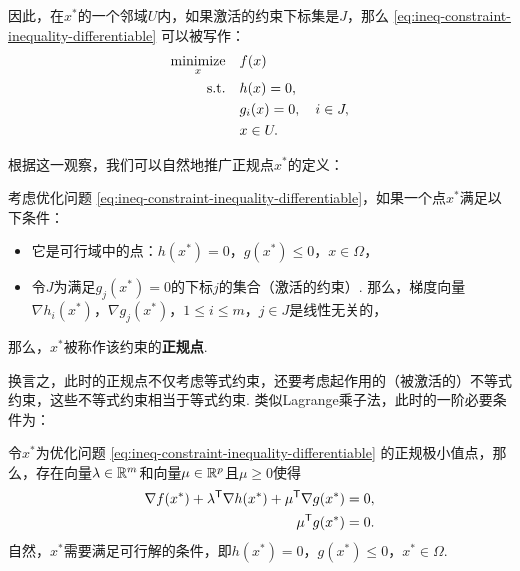 因此，在$x^*$的一个邻域$U$内，如果激活的约束下标集是$J$，那么 \eqref{eq:ineq-constraint-inequality-differentiable} 可以被写作：
\begin{equation}
\begin{aligned}
    \operatorname*{minimize}_x\quad& f(x) \\
    \text{s.t.}\quad& h(x)=0, \\
    &g_i(x)=0, \quad i\in J,\\
    & x \in U.
\end{aligned}
\label{eq:ineq-constraint-inequality-differentiable-active}
\end{equation}

根据这一观察，我们可以自然地推广正规点$x^*$的定义：
\begin{definition}[正规点]
考虑优化问题 \eqref{eq:ineq-constraint-inequality-differentiable}，如果一个点$x^*$满足以下条件：
\begin{itemize}
    \item 它是可行域中的点：$h(x^*)=0$，$g(x^*)\leq 0$，$x\in\Omega$，
    \item 令$J$为满足$g_j(x^*)=0$的下标$j$的集合（激活的约束）. 那么，梯度向量$\nabla h_i(x^*)$，$\nabla g_j(x^*)$，$1\leq i \leq m$，$j\in J$是线性无关的，
\end{itemize}
那么，$x^*$被称作该约束的\textbf{正规点}.
\end{definition}

换言之，此时的正规点不仅考虑等式约束，还要考虑起作用的（被激活的）不等式约束，这些不等式约束相当于等式约束. 类似Lagrange乘子法，此时的一阶必要条件为：

\begin{theorem}\label{theorem:KKT}
令$x^*$为优化问题 \eqref{eq:ineq-constraint-inequality-differentiable} 的正规极小值点，那么，存在向量$\lambda\in\mathbb{R}^m$和向量$\mu\in \mathbb{R}^p$且$\mu\geq 0$使得
\begin{align}
    \nabla f(x^*)+\lambda^{\mathsf{T}} \nabla {h(x^*)}+\mu^{\mathsf{T}} \nabla g(x^*)&=0,\label{eq:KKT-1}\\
    {\mu^{\mathsf{T}} g(x^*)}&=0.\label{eq:KKT-2}
\end{align}
自然，$x^*$需要满足可行解的条件，即$h(x^*)=0$，$g(x^*)\leq 0$，$x^*\in\Omega$.
\end{theorem}

